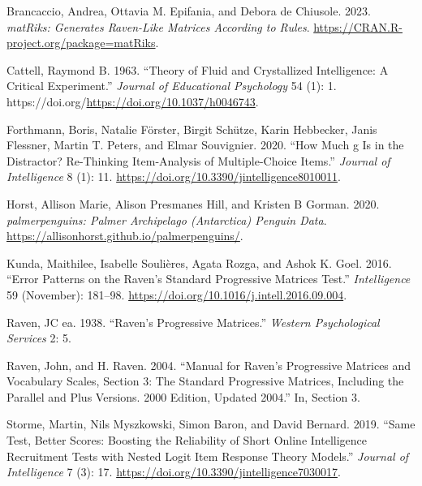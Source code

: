 \hypertarget{refs}{}
\begin{CSLReferences}{1}{0}
\leavevmode{}%
Brancaccio, Andrea, Ottavia M. Epifania, and Debora de Chiusole. 2023. \emph{matRiks: Generates Raven-Like Matrices According to Rules}. \url{https://CRAN.R-project.org/package=matRiks}.

\leavevmode{}%
Cattell, Raymond B. 1963. {``Theory of Fluid and Crystallized Intelligence: A Critical Experiment.''} \emph{Journal of Educational Psychology} 54 (1): 1. https://doi.org/\url{https://doi.org/10.1037/h0046743}.

\leavevmode{}%
Forthmann, Boris, Natalie Förster, Birgit Schütze, Karin Hebbecker, Janis Flessner, Martin T. Peters, and Elmar Souvignier. 2020. {``How {Much} g {Is} in the {Distractor}? {Re}-{Thinking} {Item}-{Analysis} of {Multiple}-{Choice} {Items}.''} \emph{Journal of Intelligence} 8 (1): 11. \url{https://doi.org/10.3390/jintelligence8010011}.

\leavevmode{}%
Horst, Allison Marie, Alison Presmanes Hill, and Kristen B Gorman. 2020. \emph{{palmerpenguins}: Palmer Archipelago (Antarctica) Penguin Data}. \url{https://allisonhorst.github.io/palmerpenguins/}.

\leavevmode{}%
Kunda, Maithilee, Isabelle Soulières, Agata Rozga, and Ashok K. Goel. 2016. {``Error Patterns on the {Raven}'s {Standard} {Progressive} {Matrices} {Test}.''} \emph{Intelligence} 59 (November): 181--98. \url{https://doi.org/10.1016/j.intell.2016.09.004}.

\leavevmode{}%
Raven, JC ea. 1938. {``Raven's Progressive Matrices.''} \emph{Western Psychological Services} 2: 5.

\leavevmode{}%
Raven, John, and H. Raven. 2004. {``Manual for {Raven}'s {Progressive} {Matrices} and {Vocabulary} {Scales}, {Section} 3: {The} {Standard} {Progressive} {Matrices}, {Including} the {Parallel} and {Plus} {Versions}. 2000 {Edition}, Updated 2004.''} In, Section 3.

\leavevmode{}%
Storme, Martin, Nils Myszkowski, Simon Baron, and David Bernard. 2019. {``Same {Test}, {Better} {Scores}: {Boosting} the {Reliability} of {Short} {Online} {Intelligence} {Recruitment} {Tests} with {Nested} {Logit} {Item} {Response} {Theory} {Models}.''} \emph{Journal of Intelligence} 7 (3): 17. \url{https://doi.org/10.3390/jintelligence7030017}.

\end{CSLReferences}

